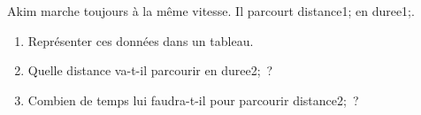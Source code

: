 \documentclass[exercice]{thedocument}%
\begin{document}
%
Akim marche toujours à la même vitesse. Il parcourt \<distance1;
en \<duree1;.
\begin{enumerate}
    \item Représenter ces données dans un tableau.
    \item Quelle distance va-t-il parcourir en \<duree2;~?
    \item Combien de temps lui faudra-t-il pour parcourir \<distance2;~?
\end{enumerate} 
\end{document}
